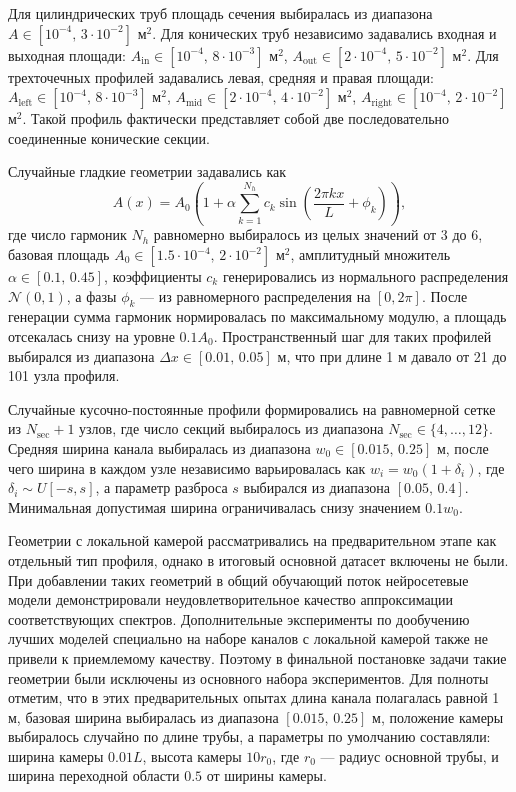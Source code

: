 Для цилиндрических труб площадь сечения выбиралась из диапазона $A \in [10^{-4},\, 3 \cdot 10^{-2}]$ м$^2$. Для конических труб независимо задавались входная и выходная площади: $A_\text{in} \in [10^{-4},\, 8 \cdot 10^{-3}]$ м$^2$, $A_\text{out} \in [2 \cdot 10^{-4},\, 5 \cdot 10^{-2}]$ м$^2$. Для трехточечных профилей задавались левая, средняя и правая площади: $A_\text{left} \in [10^{-4},\, 8 \cdot 10^{-3}]$ м$^2$, $A_\text{mid} \in [2 \cdot 10^{-4},\, 4 \cdot 10^{-2}]$ м$^2$, $A_\text{right} \in [10^{-4},\, 2 \cdot 10^{-2}]$ м$^2$. Такой профиль фактически представляет собой две последовательно соединенные конические секции.

Случайные гладкие геометрии задавались как
\begin{equation}
    A(x) = A_0 \left(1 + \alpha \sum_{k=1}^{N_h} c_k \sin\left(\frac{2 \pi k x}{L} + \phi_k\right)\right),
\end{equation}
где число гармоник $N_h$ равномерно выбиралось из целых значений от $3$ до $6$, базовая площадь $A_0 \in [1.5 \cdot 10^{-4},\, 2 \cdot 10^{-2}]$ м$^2$, амплитудный множитель $\alpha \in [0.1,\, 0.45]$, коэффициенты $c_k$ генерировались из нормального распределения $\mathcal{N}(0,1)$, а фазы $\phi_k$ --- из равномерного распределения на $[0, 2\pi]$. После генерации сумма гармоник нормировалась по максимальному модулю, а площадь отсекалась снизу на уровне $0.1A_0$. Пространственный шаг для таких профилей выбирался из диапазона $\Delta x \in [0.01,\, 0.05]$ м, что при длине 1 м давало от 21 до 101 узла профиля.

Случайные кусочно-постоянные профили формировались на равномерной сетке из $N_\text{sec}+1$ узлов, где число секций выбиралось из диапазона $N_\text{sec} \in \{4,\dots,12\}$. Средняя ширина канала выбиралась из диапазона $w_0 \in [0.015,\, 0.25]$ м, после чего ширина в каждом узле независимо варьировалась как $w_i = w_0(1+\delta_i)$, где $\delta_i \sim U[-s,s]$, а параметр разброса $s$ выбирался из диапазона $[0.05,\, 0.4]$. Минимальная допустимая ширина ограничивалась снизу значением $0.1w_0$.

Геометрии с локальной камерой рассматривались на предварительном этапе как отдельный тип профиля, однако в итоговый основной датасет включены не были. При добавлении таких геометрий в общий обучающий поток нейросетевые модели демонстрировали неудовлетворительное качество аппроксимации соответствующих спектров. Дополнительные эксперименты по дообучению лучших моделей специально на наборе каналов с локальной камерой также не привели к приемлемому качеству. Поэтому в финальной постановке задачи такие геометрии были исключены из основного набора экспериментов. Для полноты отметим, что в этих предварительных опытах длина канала полагалась равной 1 м, базовая ширина выбиралась из диапазона $[0.015,\, 0.25]$ м, положение камеры выбиралось случайно по длине трубы, а параметры по умолчанию составляли: ширина камеры $0.01L$, высота камеры $10r_0$, где $r_0$ --- радиус основной трубы, и ширина переходной области $0.5$ от ширины камеры.


